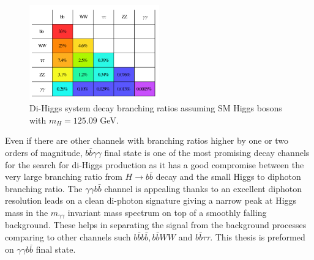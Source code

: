 \begin{figure}[htbp]
    \centering
    \includegraphics[width=0.5\textwidth]{Ch1/Img/HH_decays.png}
    \caption{Di-Higgs system decay branching ratios assuming SM Higgs bosons with $m_H=125.09$ GeV.}
    \label{fig:chap1:HH:HPD:DCY}
\end{figure}
Even if there are other channels with branching ratios higher by one or two orders of magnitude, $b\bar{b}\gamma\gamma$ final state is one of the most promising decay channels for the search for di-Higgs production as it has a good compromise between the very large branching ratio from $H\rightarrow b\bar{b}$ decay and the small Higgs to diphoton branching ratio. The $\gamma\gamma b\bar{b}$ channel is appealing thanks to an excellent diphoton resolution leads on a clean di-photon signature giving a narrow peak at Higgs mass in the $m_{\gamma\gamma}$ invariant mass spectrum
on top of a smoothly falling background. These helps in separating the signal from the background processes comparing to other channels such $b\bar{b}b\bar{b}, b\bar{b}WW$ and $b\bar{b}\tau\tau$. This thesis is preformed on $\gamma\gamma b\bar{b}$ final state.
